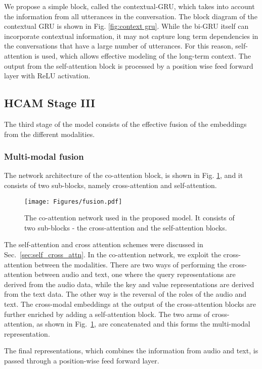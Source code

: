 \documentclass[lettersize,journal]{IEEEtran}
\begin{document}
We propose a simple block, called the contextual-GRU, which takes into account the information from all utterances in the conversation.  
The block diagram of the contextual GRU is shown in Fig. \ref{fig:context gru}.  While the bi-GRU itself can incorporate contextual information, it may not capture long term dependencies in the conversations that have a large number of utterances. For this reason, self-attention is used, which allows effective modeling of the long-term context. 
The output from the self-attention block is processed by a position wise feed forward layer with ReLU activation. 
\subsection{HCAM Stage III}\label{stage3}
The third stage of the model consists of the effective fusion of the embeddings from the different modalities. 


\subsubsection{Multi-modal fusion}\label{coatt}
The network architecture of the co-attention block, is shown in Fig. \ref{fig:attention}, and it consists of two sub-blocks, namely cross-attention and self-attention. 
\begin{figure}
    \centering
    \texttt{[image: Figures/fusion.pdf]}
    \caption{The co-attention network used in the proposed model. It consists of two sub-blocks - the cross-attention and the self-attention blocks.}
    \label{fig:attention}
\end{figure}
The self-attention and cross attention schemes were discussed in Sec.~\ref{sec:self_cross_attn}. In the co-attention network, we exploit the cross-attention between the modalities. 
There are two ways of performing the cross-attention between audio and text, one where the query representations are derived from the audio data, while the key and value representations are derived from the text data.
The other way is the reversal of the roles of the audio and text. The cross-modal embeddings at the output of the cross-attention blocks are further enriched by adding a self-attention block.  The two arms of cross-attention, as shown in Fig.~\ref{fig:attention}, are concatenated and this forms the multi-modal representation. 

The final representations, which combines the information from audio and text, is passed through a position-wise feed forward layer. 
\end{document}
